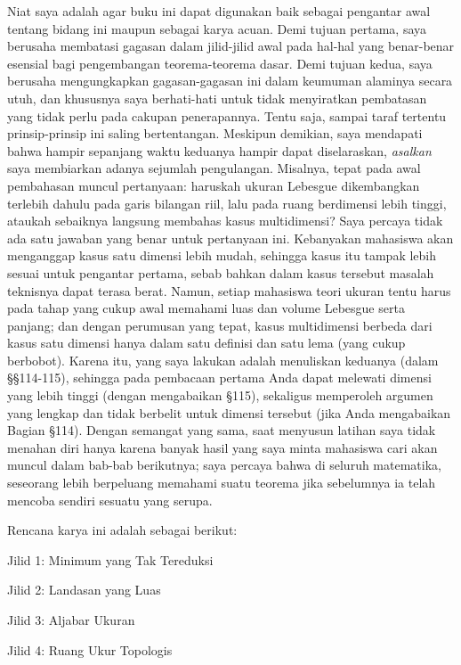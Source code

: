 Niat saya adalah agar buku ini dapat digunakan baik sebagai pengantar
awal tentang bidang ini maupun sebagai karya acuan.   Demi tujuan pertama,
saya berusaha membatasi gagasan dalam jilid-jilid awal pada hal-hal yang
benar-benar esensial bagi pengembangan teorema-teorema dasar.
Demi tujuan kedua, saya berusaha mengungkapkan gagasan-gagasan ini dalam
keumuman alaminya secara utuh, dan khususnya saya berhati-hati untuk tidak
menyiratkan pembatasan yang tidak perlu pada cakupan penerapannya.   Tentu
saja, sampai taraf tertentu prinsip-prinsip ini saling bertentangan.
Meskipun demikian, saya mendapati bahwa hampir sepanjang waktu keduanya
hampir dapat diselaraskan, {\it asalkan} saya membiarkan adanya sejumlah
pengulangan.   Misalnya, tepat pada awal pembahasan muncul pertanyaan:
haruskah ukuran Lebesgue dikembangkan terlebih dahulu pada garis bilangan
riil, lalu pada ruang berdimensi lebih tinggi, ataukah sebaiknya langsung
membahas kasus multidimensi?   Saya percaya tidak ada satu jawaban yang benar
untuk pertanyaan ini.   Kebanyakan mahasiswa akan menganggap kasus satu
dimensi lebih mudah, sehingga kasus itu tampak lebih sesuai untuk pengantar
pertama, sebab bahkan dalam kasus tersebut masalah teknisnya dapat terasa
berat.   Namun, setiap mahasiswa teori ukuran tentu harus pada tahap yang
cukup awal
memahami luas dan volume Lebesgue serta panjang;
dan dengan perumusan yang tepat, kasus multidimensi berbeda dari kasus satu
dimensi hanya dalam satu definisi dan satu lema (yang cukup berbobot).
Karena itu, yang saya lakukan adalah menuliskan keduanya (dalam
\S\S114-115), sehingga pada pembacaan pertama Anda dapat melewati dimensi
yang lebih tinggi (dengan mengabaikan \S115), sekaligus memperoleh argumen
yang lengkap dan tidak berbelit untuk dimensi tersebut (jika Anda mengabaikan
Bagian \S114).
Dengan semangat yang sama, saat menyusun latihan saya tidak menahan diri
hanya karena banyak hasil yang saya minta mahasiswa cari akan muncul
dalam bab-bab berikutnya;  saya percaya bahwa di seluruh matematika, seseorang
lebih berpeluang memahami suatu teorema jika sebelumnya ia telah mencoba
sendiri sesuatu yang serupa.

Rencana karya ini adalah sebagai berikut:

\medskip

\qquad\qquad Jilid 1:  Minimum yang Tak Tereduksi

\qquad\qquad Jilid 2:  Landasan yang Luas

\qquad\qquad Jilid 3:  Aljabar Ukuran

\qquad\qquad Jilid 4:  Ruang Ukur Topologis

